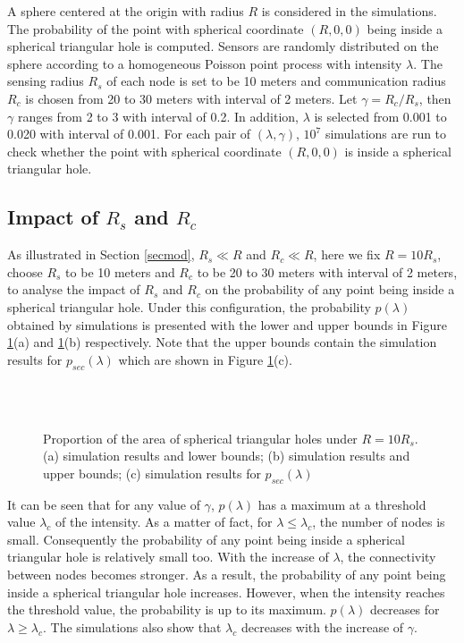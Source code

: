 \documentclass[journal, twoside]{IEEEtran}
\begin{document}
A sphere centered at the origin with radius $R$ is considered in the simulations.
The probability of the point with spherical coordinate $(R, 0, 0)$ being inside a spherical triangular hole
is computed. Sensors are randomly distributed on the sphere 
according to a homogeneous Poisson point process with intensity $\lambda$. The sensing
radius $R_s$ of each node is set to be 10 meters and communication radius $R_c$
is chosen from 20 to 30 meters with interval of 2 meters. Let $\gamma = R_c/R_s$, then
$\gamma$ ranges from 2 to 3 with interval of 0.2. In addition, $\lambda$ is
selected from 0.001 to 0.020 with interval of 0.001. For each pair of $(\lambda, \gamma)$,
$10^7$ simulations are run to check whether the
point with spherical coordinate $(R, 0, 0)$ is inside a spherical triangular hole.

\subsection{Impact of $R_s$ and $R_c$}

As illustrated in Section \ref{secmod}, $R_s \ll R$ and $R_c \ll R$, here we fix
$R = 10 R_s$, choose $R_s$ to be 10 meters and $R_c$ to be 20 to 30 meters with interval of 2 meters, to analyse the impact of $R_s$ and $R_c$ on the probability of any point being inside a spherical
triangular hole. Under this configuration, the probability $p(\lambda)$ obtained by simulations is presented with the lower
and upper bounds in Figure \ref{figbound}(a) and \ref{figbound}(b) respectively. 
Note that the upper bounds contain the simulation results for $p_{sec}(\lambda)$
which are shown in Figure \ref{figbound}(c).

\begin{figure}[ht]
  \centering {}
  \\
  \\
  \caption{Proportion of the area of spherical triangular holes under $R = 10 R_s$. (a) simulation results and
    lower bounds; (b) simulation results and upper bounds; (c) simulation results for $p_{sec}(\lambda)$}
  \label{figbound}
\end{figure}


It can be seen that for any value of $\gamma$, $p(\lambda)$ has a maximum at a threshold value 
$\lambda_{c}$ of the intensity. As a matter of fact, for $\lambda \leq \lambda_{c}$, 
the number of nodes is small. Consequently the probability of any point being inside 
a spherical triangular hole is relatively small too. With the increase of $\lambda$, the 
connectivity between nodes becomes stronger. As a result, the probability of any point being 
inside a spherical triangular hole increases. However, when the intensity reaches 
the threshold value, the probability is up to its maximum.  $p(\lambda)$ 
decreases for $\lambda \geq \lambda_{c}$. The simulations also show  that $\lambda_{c}$ 
decreases with the increase of $\gamma$. 
\end{document}
